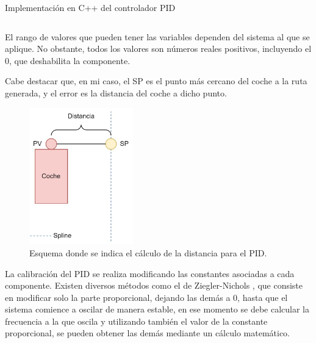 \bigskip


\begin{listing}[H]
    \caption{Implementación en C++ del controlador PID}
    \inputminted[fontsize=\scriptsize, linenos, bgcolor=LightGray, frame=lines, framesep=3mm, baselinestretch=1.2]{C++}{snippets/PID.cpp}
    \label{lst:pidcpp}
\end{listing}

El rango de valores que pueden tener las variables dependen del sistema al que se aplique. No obstante, todos los valores son números reales positivos, incluyendo el 0, que deshabilita la componente.

\bigskip

Cabe destacar que, en mi caso, el SP es el punto más cercano del coche a la ruta generada, y el error es la distancia del coche a dicho punto.

\begin{figure}[H]
    \centering
    \includegraphics[width=0.4\textwidth]{imagenes/converted/errorPID.jpg}
    \caption{Esquema donde se indica el cálculo de la distancia para el PID.}
    \label{fig:errorpid}
    \end{figure}

La calibración del PID se realiza modificando las constantes asociadas a cada componente. Existen diversos métodos como el de Ziegler-Nichols \cite{10.1115/1.4019264}, que consiste en modificar solo la parte proporcional, dejando las demás a 0, hasta que el sistema comience a oscilar de manera estable, en ese momento se debe calcular la frecuencia a la que oscila y utilizando también el valor de la constante proporcional, se pueden obtener las demás mediante un cálculo matemático.

